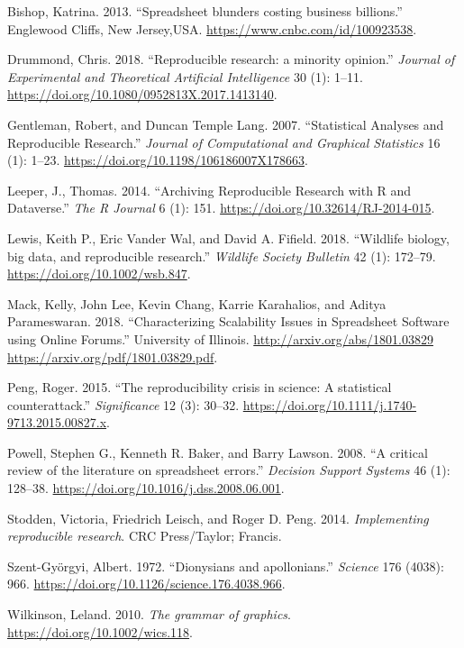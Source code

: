 \documentclass[smallextended]{svjour3}       %
\newlength{\cslhangindent}
\newlength{\cslentryspacingunit} %
\newenvironment{CSLReferences}[2] %
 {%
  \setlength{\parindent}{0pt}
  \ifodd #1
  \let\oldpar\par
  \def\par{\hangindent=\cslhangindent\oldpar}
  \fi
  \setlength{\parskip}{#2\cslentryspacingunit}
 }%
 {}
\begin{document}
\hypertarget{refs}{}
\begin{CSLReferences}{1}{0}
\leavevmode{}%
Bishop, Katrina. 2013. {``{Spreadsheet blunders costing business billions}.''} Englewood Cliffs, New Jersey,USA. \url{https://www.cnbc.com/id/100923538}.

\leavevmode{}%
Drummond, Chris. 2018. {``{Reproducible research: a minority opinion}.''} \emph{Journal of Experimental and Theoretical Artificial Intelligence} 30 (1): 1--11. \url{https://doi.org/10.1080/0952813X.2017.1413140}.

\leavevmode{}%
Gentleman, Robert, and Duncan Temple Lang. 2007. {``{Statistical Analyses and Reproducible Research}.''} \emph{Journal of Computational and Graphical Statistics} 16 (1): 1--23. \url{https://doi.org/10.1198/106186007X178663}.

\leavevmode{}%
Leeper, J., Thomas. 2014. {``{Archiving Reproducible Research with R and Dataverse}.''} \emph{The R Journal} 6 (1): 151. \url{https://doi.org/10.32614/RJ-2014-015}.

\leavevmode{}%
Lewis, Keith P., Eric Vander Wal, and David A. Fifield. 2018. {``{Wildlife biology, big data, and reproducible research}.''} \emph{Wildlife Society Bulletin} 42 (1): 172--79. \url{https://doi.org/10.1002/wsb.847}.

\leavevmode{}%
Mack, Kelly, John Lee, Kevin Chang, Karrie Karahalios, and Aditya Parameswaran. 2018. {``{Characterizing Scalability Issues in Spreadsheet Software using Online Forums}.''} University of Illinois. \href{http://arxiv.org/abs/1801.03829\%20https://arxiv.org/pdf/1801.03829.pdf}{http://arxiv.org/abs/1801.03829 https://arxiv.org/pdf/1801.03829.pdf}.

\leavevmode{}%
Peng, Roger. 2015. {``{The reproducibility crisis in science: A statistical counterattack}.''} \emph{Significance} 12 (3): 30--32. \url{https://doi.org/10.1111/j.1740-9713.2015.00827.x}.

\leavevmode{}%
Powell, Stephen G., Kenneth R. Baker, and Barry Lawson. 2008. {``{A critical review of the literature on spreadsheet errors}.''} \emph{Decision Support Systems} 46 (1): 128--38. \url{https://doi.org/10.1016/j.dss.2008.06.001}.

\leavevmode{}%
Stodden, Victoria, Friedrich Leisch, and Roger D. Peng. 2014. \emph{{Implementing reproducible research}}. CRC Press/Taylor; Francis.

\leavevmode{}%
Szent-Györgyi, Albert. 1972. {``{Dionysians and apollonians}.''} \emph{Science} 176 (4038): 966. \url{https://doi.org/10.1126/science.176.4038.966}.

\leavevmode{}%
Wilkinson, Leland. 2010. \emph{{The grammar of graphics}}. \url{https://doi.org/10.1002/wics.118}.

\end{CSLReferences}




\end{document}
